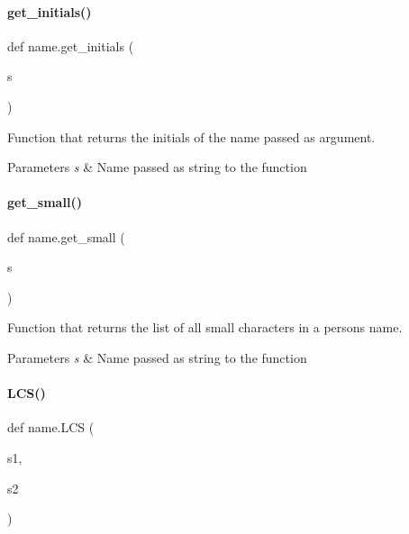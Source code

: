 \paragraph{\texorpdfstring{get\+\_\+initials()}{get\_initials()}}
{\footnotesize\ttfamily def name.\+get\+\_\+initials (\begin{DoxyParamCaption}\item[{}]{s }\end{DoxyParamCaption})}



Function that returns the initials of the name passed as argument. 


\begin{DoxyParams}{Parameters}
{\em s} & Name passed as string to the function \\
\hline
\end{DoxyParams}
\mbox{\label{namespacename_aea030be0c4aba39c00144f53b219b5fb}} 
\paragraph{\texorpdfstring{get\+\_\+small()}{get\_small()}}
{\footnotesize\ttfamily def name.\+get\+\_\+small (\begin{DoxyParamCaption}\item[{}]{s }\end{DoxyParamCaption})}



Function that returns the list of all small characters in a person\textquotesingle{}s name. 


\begin{DoxyParams}{Parameters}
{\em s} & Name passed as string to the function \\
\hline
\end{DoxyParams}
\mbox{\label{namespacename_a662ec0d5b529dcd09fe92f4011739422}} 
\paragraph{\texorpdfstring{L\+C\+S()}{LCS()}}
{\footnotesize\ttfamily def name.\+L\+CS (\begin{DoxyParamCaption}\item[{}]{s1,  }\item[{}]{s2 }\end{DoxyParamCaption})}



